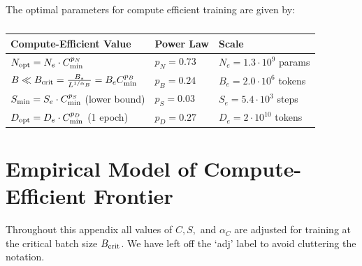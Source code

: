\documentclass[english]{article}
\begin{document}
The optimal parameters for compute efficient training are given by:

\begin{table}[h!]
\centering
\vspace{-0.5em}
\begin{tabular}{|l|l|l|}
\hline 
\textbf{Compute-Efficient Value} & \textbf{Power Law} & \textbf{Scale}\tabularnewline
\hline 
\hline 
$N_{{\rm opt}}=N_{e}\cdot C_{{\rm min}}^{p_{N}}$ & $p_{N}=0.73$ & $N_{e}=1.3\cdot10^{9}$ params\tabularnewline
\hline 
$B \ll B_{{\rm crit}}=\frac{B_{\ast}}{L^{1/\alpha_{B}}}=B_{e}C_{{\rm min}}^{p_{B}}$ & $p_{B}=0.24$ & $B_{e}=2.0\cdot10^{6}$ tokens\tabularnewline
\hline 
$S_{{\rm min}}=S_{e}\cdot C_{{\rm min}}^{p_{S}}$ (lower bound) & $p_{S}=0.03$ & $S_{e}=5.4\cdot10^{3}$ steps\tabularnewline
\hline 
$D_{{\rm opt}}=D_{e}\cdot C_{{\rm min}}^{p_{D}}$ (1 epoch) & $p_{D}=0.27$ & $D_{e}=2\cdot10^{10}$ tokens\tabularnewline
\hline 
\end{tabular}
\vspace{0.5em}
\caption[Trends for compute-efficient training]{}
\vspace{-1em}
\end{table}

\section{Empirical Model of Compute-Efficient Frontier}
\label{app:ComputeEfficientTraining}

Throughout this appendix all values of $C, S,$ and $\alpha_C$ are adjusted for training at the critical batch size $B_{\rm crit}$.  We have left off the `adj' label to avoid cluttering the notation. 
\end{document}

